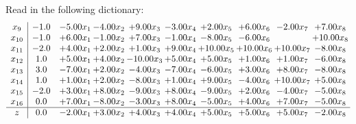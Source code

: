 \documentclass[9pt]{article}
\begin{document}
Read in the following dictionary:
\[\begin{array}{c| c c@{\hskip 2pt} c@{\hskip 2pt} c@{\hskip 2pt} c@{\hskip 2pt} c@{\hskip 2pt} c@{\hskip 2pt} c@{\hskip 2pt} c@{\hskip 2pt} }
 x_{9}   &  -1.0 & -5.00 x_{1} & -4.00 x_{2} & +  9.00 x_{3} & -3.00 x_{4} & +  2.00 x_{5} & +  6.00 x_{6} & -2.00 x_{7} & +  7.00 x_{8}\\
 x_{10}   &  -1.0 & +  6.00 x_{1} & -1.00 x_{2} & +  7.00 x_{3} & -1.00 x_{4} & -8.00 x_{5} & -6.00 x_{6} &   & + 10.00 x_{8}\\
 x_{11}   &  -2.0 & +  4.00 x_{1} & +  2.00 x_{2} & +  1.00 x_{3} & +  9.00 x_{4} & + 10.00 x_{5} & + 10.00 x_{6} & + 10.00 x_{7} & -8.00 x_{8}\\
 x_{12}   &  1.0 & +  5.00 x_{1} & +  4.00 x_{2} & -10.00 x_{3} & +  5.00 x_{4} & +  5.00 x_{5} & +  1.00 x_{6} & +  1.00 x_{7} & -6.00 x_{8}\\
 x_{13}   &  3.0 & -7.00 x_{1} & +  2.00 x_{2} & -4.00 x_{3} & -7.00 x_{4} & -6.00 x_{5} & +  3.00 x_{6} & +  8.00 x_{7} & -8.00 x_{8}\\
 x_{14}   &  1.0 & +  1.00 x_{1} & +  2.00 x_{2} & -8.00 x_{3} & +  1.00 x_{4} & +  9.00 x_{5} & -4.00 x_{6} & + 10.00 x_{7} & +  5.00 x_{8}\\
 x_{15}   &  -2.0 & +  3.00 x_{1} & +  8.00 x_{2} & -9.00 x_{3} & +  8.00 x_{4} & -9.00 x_{5} & +  2.00 x_{6} & -4.00 x_{7} & -5.00 x_{8}\\
 x_{16}   &  0.0 & +  7.00 x_{1} & -8.00 x_{2} & -3.00 x_{3} & +  8.00 x_{4} & -5.00 x_{5} & +  4.00 x_{6} & +  7.00 x_{7} & -5.00 x_{8}\\
\hline
z    &  0.0 & -2.00 x_{1} & +  3.00 x_{2} & +  4.00 x_{3} & +  4.00 x_{4} & +  5.00 x_{5} & +  5.00 x_{6} & +  5.00 x_{7} & -2.00 x_{8}\\
\end{array}\]
\end{document}
